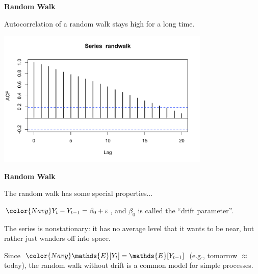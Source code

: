 \documentclass[12pt,xcolor=svgnames]{beamer}
\newcommand{\bk}{\color{black}}
\newcommand{\nv}{\color{Navy}}
\newcommand{\theme}{\color{Maroon}}
\newcommand{\ds}[1]{\mathds{#1}}
\newcommand{\sk}{\vspace{.5cm}}
\begin{document}
\begin{frame}

{\bf Random Walk}\sk

Autocorrelation of a random walk stays high for a long time.

\includegraphics[width=4in]{../graphs/acfrandwalk}

\end{frame}


\begin{frame}

{\bf Random Walk}\sk

The random walk has some special properties...

\sk
$\nv Y_t - Y_{t-1} = \beta_0 + \varepsilon$, and $\beta_0$ is called the ``drift parameter''.

\sk
The series is \nv nonstationary\bk: it has no average level that it wants to be near, 
but rather just wanders off into space.

\sk Since $\nv \ds{E}[Y_t] = \ds{E}[Y_{t-1}]$ (e.g., tomorrow $\approx$
today), the random walk \theme without drift \bk is a common model for
simple processes.
\end{frame}



\end{document}
